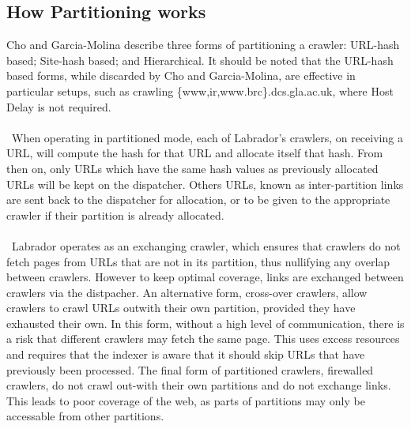 \subsection{How Partitioning works}
Cho and Garcia-Molina describe\cite{ref3} three forms of partitioning a crawler: URL-hash based; Site-hash based; and Hierarchical. It should be noted that the URL-hash based forms, while discarded by Cho and Garcia-Molina, are effective in particular setups, such as crawling \{www,ir,www.brc\}.dcs.gla.ac.uk, where Host Delay is not required.\\
\\ \
When operating in partitioned mode, each of Labrador's crawlers, on receiving a URL, will compute the hash for that URL and allocate itself that hash. From then on, only URLs which have the same hash values as previously allocated URLs will be kept on the dispatcher. Others URLs, known as inter-partition links are sent back to the dispatcher for allocation, or to be given to the appropriate crawler if their partition is already allocated.\\
\\ \
Labrador operates as an exchanging crawler\cite{ref3}, which ensures that crawlers do not fetch pages from URLs that are not in its partition, thus nullifying any overlap between crawlers. However to keep optimal coverage, links are exchanged between crawlers via the distpacher. An alternative form, cross-over crawlers, allow crawlers to crawl URLs outwith their own partition, provided they have exhausted their own. In this form, without a high level of communication, there is a risk that different crawlers may fetch the same page. This uses excess resources and requires that the indexer is aware that it should skip URLs that have previously been processed. The final form of partitioned crawlers, firewalled crawlers, do not crawl out-with their own partitions and do not exchange links. This leads to poor coverage of the web, as parts of partitions may only be accessable from other partitions.

